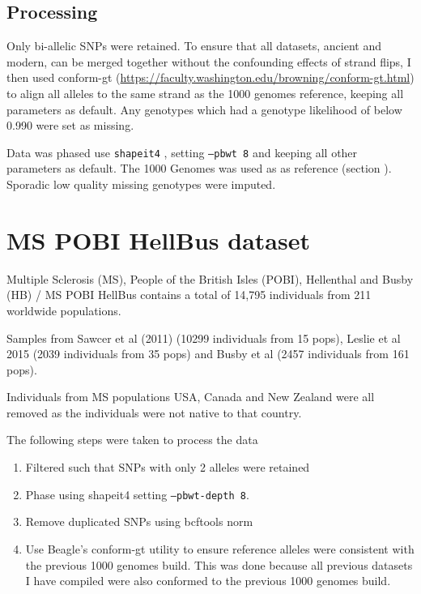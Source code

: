 \subsection{Processing}

Only bi-allelic SNPs were retained. To ensure that all datasets, ancient and modern, can be merged together without the confounding effects of strand flips, I then used conform-gt (\url{https://faculty.washington.edu/browning/conform-gt.html}) to align all alleles to the same strand as the 1000 genomes reference, keeping all parameters as default. Any genotypes which had a genotype likelihood of below 0.990 were set as missing.

Data was phased use \texttt{shapeit4} \cite{delaneau2018integrative}, setting \texttt{--pbwt 8} and keeping all other parameters as default. The 1000 Genomes was used as as reference (section \cite{1000genomesdataset}). Sporadic low quality missing genotypes were imputed. 



\section{MS POBI HellBus dataset} \label{sssec:MSPOBIHellBus}


Multiple Sclerosis (MS), People of the British Isles (POBI), Hellenthal and Busby (HB) / MS POBI HellBus contains a total of 14,795 individuals from 211 worldwide populations. 

Samples from Sawcer et al (2011) \cite{Sawcer2011} (10299 individuals from 15 pops), Leslie et al 2015 \cite{Leslie2015} (2039 individuals from 35 pops) and Busby et al (2457 individuals from  161 pops). 

Individuals from MS populations USA, Canada and New Zealand were all removed as the individuals were not native to that country.

The following steps were taken to process the data

\begin{enumerate}
\item Filtered such that SNPs with only 2 alleles were retained
\item Phase using shapeit4 \cite{delaneau2018integrative} setting \texttt{--pbwt-depth 8}.
\item Remove duplicated SNPs using bcftools norm \cite{li2009sequence} 
\item Use Beagle's conform-gt utility to ensure reference alleles were consistent with the previous 1000 genomes build. This was done because all previous datasets I have compiled were also conformed to the previous 1000 genomes build. 
\end{enumerate}

